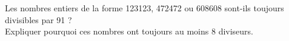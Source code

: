 
Les nombres entiers de la forme  123123, 472472 ou 608608 sont-ils toujours divisibles par 91 ?\\
Expliquer pourquoi ces nombres ont toujours au moins 8 diviseurs.